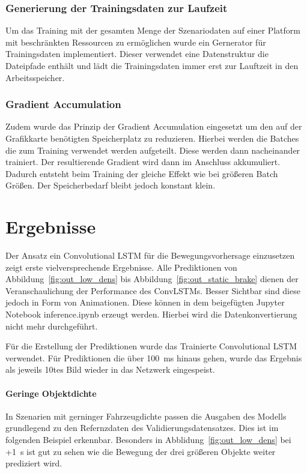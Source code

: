 \documentclass[12pt]{article}
\begin{document}
        \subsubsection{Generierung der Trainingsdaten zur Laufzeit}
            Um das Training mit der gesamten Menge der Szenariodaten auf einer Platform mit beschränkten Ressourcen zu ermöglichen wurde ein Gernerator für Trainingsdaten implementiert.
            Dieser verwendet eine Datenstruktur die Dateipfade enthält und lädt die Trainingsdaten immer erst zur Lauftzeit in den Arbeitsspeicher.
        \subsubsection{Gradient Accumulation}
            Zudem wurde das Prinzip der Gradient Accumulation eingesetzt um den auf der Grafikkarte benötigten Speicherplatz zu reduzieren. 
            Hierbei werden die Batches die zum Training verwendet werden aufgeteilt. Diese werden dann nacheinander trainiert. Der resultierende Gradient wird dann im Anschluss akkumuliert.
            Dadurch entsteht beim Training der gleiche Effekt wie bei größeren Batch Größen. Der Speicherbedarf bleibt jedoch konstant klein.~\cite{Ttowardsdatascience2021}

\pagebreak
\section{Ergebnisse}
    Der Ansatz ein Convolutional LSTM für die Bewegungsvorhersage einzusetzen zeigt erste vielversprechende Ergebnisse.
    Alle Prediktionen von Abbildung~\ref{fig:out_low_dens} bis Abbildung~\ref{fig:out_static_brake} dienen der Veranschaulichung der Performance des ConvLSTMs. 
    Besser Sichtbar sind diese jedoch in Form von Animationen. Diese können in dem beigefügten Jupyter Notebook inference.ipynb erzeugt werden. 
    Hierbei wird die Datenkonvertierung nicht mehr durchgeführt. 

    Für die Erstellung der Prediktionen wurde das Trainierte Convolutional LSTM verwendet. Für Prediktionen die über 100~ms hinaus gehen, wurde das Ergebnis als jeweils 10tes Bild wieder in das Netzwerk eingespeist.

    \paragraph{Geringe Objektdichte} In Szenarien mit gerninger Fahrzeugdichte passen die Ausgaben des Modells grundlegend zu den Refernzdaten des Validierungsdatensatzes.
    Dies ist im folgenden Beispiel erkennbar. Besonders in Abblidung~\ref{fig:out_low_dens} bei +1~s ist gut zu sehen wie die Bewegung der drei größeren Objekte weiter prediziert wird. 
\end{document}
